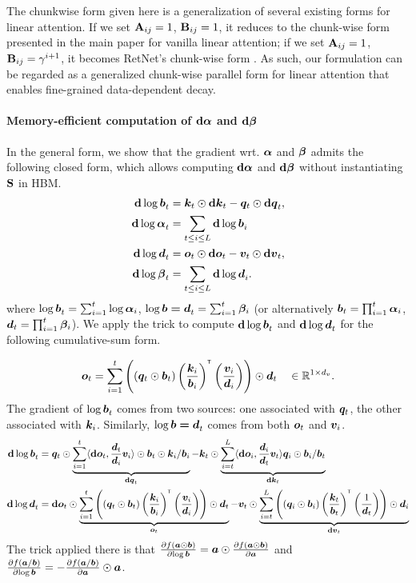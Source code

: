 The chunkwise form given here is a generalization of several existing forms for linear attention. If we set ${\mathbf{A}}_{ij}=1$, ${\mathbf{B}}_{ij} = 1$, it reduces to the chunk-wise form presented in the main paper for vanilla linear attention; if we set ${\mathbf{A}}_{ij}=1$, ${\mathbf{B}}_{ij} = \gamma^{i+1}$, it becomes RetNet's chunk-wise form \citep{sun2023retentive}. As such, our formulation can be regarded as a generalized chunk-wise parallel form for linear attention that enables fine-grained data-dependent decay. 
\paragraph{Memory-efficient computation of ${\mathbf{d}\bm{\alpha}}$ and ${\mathbf{d}\bm{\beta}}$}

In the general form, we show that the gradient wrt. ${\bm{\alpha}}$  and ${\bm{\beta}}$ admits the following closed form, which allows computing ${\mathbf{d}\bm{\alpha}}$ and ${\mathbf{d}\bm{\beta}}$ without instantiating ${\mathbf{S}}$ in HBM.
%
\begin{align*}
    {\mathbf{d}\log\bm{b}}_t &= {\bm{k}}_t \odot {\mathbf{d}\bm{k}}_t - {\bm{q}}_t \odot {\mathbf{d}\bm{q}}_t, \\
   {\mathbf{d}\log\bm{\alpha}}_t  &= \sum_{t \leq i \leq L} {\mathbf{d}\log\bm{b}}_i \\
   {\mathbf{d}\log\bm{d}}_t &= {\bm{o}}_t \odot {\mathbf{d}\bm{o}}_t - {\bm{v}}_t \odot {\mathbf{d}\bm{v}}_t, \\
   {\mathbf{d}\log\bm{\beta}}_t  &= \sum_{t \leq i \leq L} {\mathbf{d}\log\bm{d}}_i.
\end{align*}
%
where  ${\log\bm{b}}_t = \sum_{i=1}^t \log {\bm{\alpha}}_i$, ${\log\bm{b=d}}_t = \sum_{i=1}^t {\bm{\beta}}_i$ (or alternatively ${\bm{b}}_t = \prod_{i=1}^t {\bm{\alpha}}_i$, ${\bm{d}}_t = \prod_{i=1}^t {\bm{\beta}}_i$).  We apply the trick to compute ${\mathbf{d}\log\bm{b}}_t$ and ${\mathbf{d}\log\bm{d}}_t$ for the following cumulative-sum form.

\begin{align*}
    \vo_t = \sum_{i=1}^{t} \left( \left(\vq_t \odot \vb_t\right)\left(\frac{\vk_i}{\vb_i}\right)^{\intercal} \left(
    \frac{\vv_i}{\vd_i} \right) \right) \odot \vd_t \quad \in \mathbb{R}^{1\times d_v}.
\end{align*}
%
The gradient of ${\log\bm{b}}_t$ comes from two sources: one associated with ${\bm{q}}_t$, the other associated with ${\bm{k}}_i$. Similarly, ${\log\bm{b=d}}_t$ comes from both ${\bm{o}}_t$ and ${\bm{v}}_i$.
%
\begin{align*}
\vdlogb_t  &= \vq_t \odot \underbrace{\sum_{i=1}^{t} \langle \vdo_t, \frac{\vd_t}{\vd_i} \vv_i \rangle  \odot  \vb_t  \odot  \vk_i / \vb_i}_{  \vdq_t} - \vk_t \odot \underbrace{\sum_{i = t}^{L} \langle \vdo_i, \frac{\vd_i}{\vd_t} \vv_t \rangle  \vq_i \odot  \vb_i  / \vb_t}_{\vdk_t} \\
\vdlogd_t  &= \vdo_t \odot \underbrace{\sum_{i=1}^{t} \left( \left(\vq_t \odot \vb_t\right)\left(\frac{\vk_i}{\vb_i}\right)^{\intercal} \left(
    \frac{\vv_i}{\vd_i} \right) \right) \odot \vd_t}_{\vo_t} - \vv_t \odot \underbrace{\sum_{i=t}^{L} \left( \left(\vq_i \odot \vb_i\right)\left(\frac{\vk_t}{\vb_t}\right)^{\intercal} \left(
    \frac{1}{\vd_t} \right) \right) \odot \vd_i}_{\vdv_t} 
\end{align*}
%
The trick applied there is that $\frac{\partial f({\bm{a}} \odot {\bm{b}} )}{\partial {\log\bm{b}}} = {\bm{a}} \odot \frac{\partial f({\bm{a}} \odot {\bm{b}} )}{\partial {\bm{a}}}$ and  $\frac{\partial f({\bm{a}} / {\bm{b}} )}{\partial {\log\bm{b}}}  = - \frac{\partial f({\bm{a}} / {\bm{b}} )}{\partial {\bm{a}}} \odot {\bm{a}} $.

